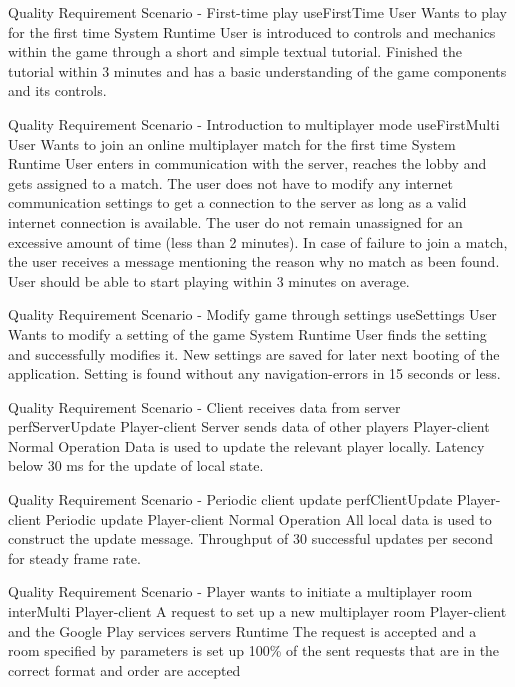 
{Quality Requirement Scenario - First-time play}
{useFirstTime}
{User}
{Wants to play for the first time}
{System}
{Runtime}
{User is introduced to controls and mechanics within the game through
a short and simple textual tutorial.}
{Finished the tutorial within 3 minutes and has a basic understanding of the game components and its controls.}

{Quality Requirement Scenario - Introduction to multiplayer mode}
{useFirstMulti}
{User}
{Wants to join an online multiplayer match for the first time}
{System}
{Runtime}
{User enters in communication with the server, reaches the lobby and gets assigned to a match.}
{The user does not have to modify any internet communication settings to get a connection to the server as long as a valid internet connection is available. The user do not remain unassigned for an excessive amount of time (less than 2 minutes). In case of failure to join a match, the user receives a message mentioning the reason why no match as been found. User should be able to start playing within 3 minutes on average.}

{Quality Requirement Scenario - Modify game through settings}
{useSettings}
{User}
{Wants to modify a setting of the game}
{System}
{Runtime}
{User finds the setting and successfully modifies it. New settings are saved for later next booting of the application.}
{Setting is found without any navigation-errors in 15 seconds or less.}


{Quality Requirement Scenario - Client receives data from server}
{perfServerUpdate}
{Player-client}
{Server sends data of other players}
{Player-client}
{Normal Operation}
{Data is used to update the relevant player locally.}
{Latency below 30 ms for the update of local state.}

{Quality Requirement Scenario - Periodic client update}
{perfClientUpdate}
{Player-client}
{Periodic update}
{Player-client}
{Normal Operation}
{All local data is used to construct the update message.}
{Throughput of 30 successful updates per second for steady frame rate.}


{Quality Requirement Scenario - Player wants to initiate a multiplayer room}
{interMulti}
{Player-client}
{A request to set up a new multiplayer room}
{Player-client and the Google Play services servers}
{Runtime}
{The request is accepted and a room specified by parameters is set up}
{100\% of the sent requests that are in the correct format and order are accepted}
